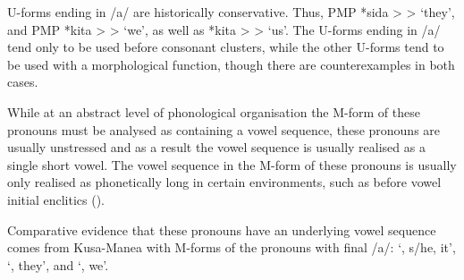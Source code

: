 \begin{exe}
	\label{ex:LexDel}
	\gw{}
\end{exe}

U-forms ending in /a/ are historically conservative.
Thus, PMP *sida >  >  `they',
and PMP *kita >  >  `we',
as well as *kita >  >  `us'.
The U-forms ending in /a/ tend only to
be used before consonant clusters, while the other
U-forms tend to be used with a morphological function,
though there are counterexamples in both cases.

While at an abstract level of phonological
organisation the M-form of these pronouns
must be analysed as containing a vowel sequence,
these pronouns are usually unstressed and as a result the vowel
sequence is usually realised as a single short vowel.
The vowel sequence in the M-form of these pronouns
is usually only realised as phonetically long in certain environments,
such as before vowel initial enclitics ().

Comparative evidence that these pronouns
have an underlying vowel sequence comes from Kusa-Manea
with M-forms of the pronouns with final /a/:
 `{\iin}, s/he, it',  `{\siin}, they',
and  `, we'.


